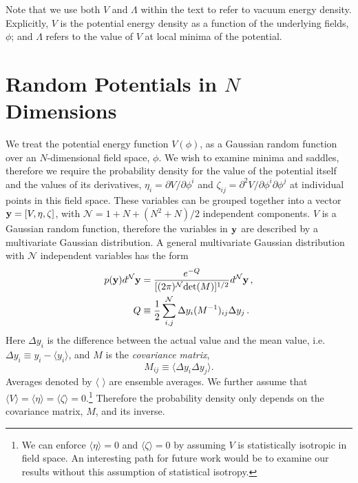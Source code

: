\documentclass[12pt]{article}
\begin{document}
Note that we use both $V$ and $\Lambda$ within the text to refer to vacuum energy density. Explicitly, $V$ is the potential energy density as a function of the underlying fields, $\phi$; and $\Lambda$ refers to the value of $V$ at local minima of the potential.
 
 
\section{Random Potentials in $N$ Dimensions}

We treat the potential energy function $V({\phi})$, as a Gaussian random function over an $N$-dimensional field space, $\phi$. We wish to examine minima and saddles, therefore we require the probability density for the value of the potential itself and the values of its derivatives, $\eta_i = \partial V/\partial \phi^i$ and $\zeta_{ij}=\partial^2 V/\partial \phi^i\partial \phi^j$ at individual points in this field space. These variables can be grouped together into a vector ${\bf y} = [V,\eta,\zeta]$, with $\mathcal{N}=1+N+(N^2+N)/2$ independent components. $V$ is a Gaussian random function, therefore the variables in ${\bf y}$ are described by a multivariate Gaussian distribution. A general multivariate Gaussian distribution with $\mathcal{N}$ independent variables has the form
\begin{equation} \label{MultivariateGaussian}
\begin{split}
p({\bf y})d^\mathcal{N}{\bf y} &= \frac{e^{-Q}}{[(2\pi)^\mathcal{N} \mathrm{det}(M)]^{1/2}} d^\mathcal{N}{\bf y} \, ,\\
Q &\equiv \frac{1}{2} \sum_{i,j}^\mathcal{N} \Delta y_i (M^{-1})_{ij} \Delta y_{j} \, .\\
\end{split}
\end{equation}
%
Here $\Delta y_i$ is the difference between the actual value and the mean value, i.e. $\Delta y_i \equiv y_i - \langle y_i \rangle$, and $M$ is the \emph{covariance matrix}, 
%
\begin{equation}
M_{ij} \equiv \langle \Delta y_i \Delta y_j \rangle.
\end{equation}
%
Averages denoted by $\langle \,\,\rangle$ are ensemble averages. We further assume that $\langle V\rangle = \langle \eta\rangle = \langle \zeta\rangle = 0$.\footnote{We can enforce $\langle \eta \rangle = 0$ and $\langle \zeta\rangle = 0$ by assuming $V$ is statistically isotropic in field space. An interesting path for future work would be to examine our results without this assumption of statistical isotropy.} Therefore the probability density only depends on the covariance matrix, $M$, and its inverse.
\end{document}
